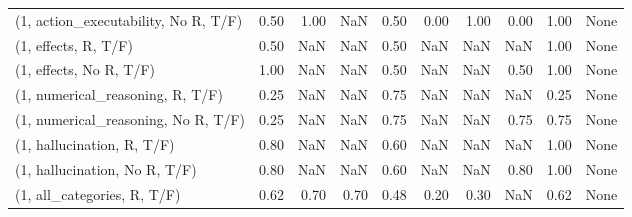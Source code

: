 \begin{table*}[h!]
\begin{adjustbox}{width=2\columnwidth,center}
\begin{tabular}{lrrr|rrr|rrr}
(1, action\_executability, No R, T/F) &                      0.50 &                  1.00 &                       NaN &                          0.50 &                      0.00 &                          1.00 &                                   0.00 &                               1.00 &                                  None \\
(1, effects, R, T/F)                 &                      0.50 &                   NaN &                       NaN &                          0.50 &                       NaN &                           NaN &                                    NaN &                               1.00 &                                  None \\
(1, effects, No R, T/F)              &                      1.00 &                   NaN &                       NaN &                          0.50 &                       NaN &                           NaN &                                   0.50 &                               1.00 &                                  None \\
(1, numerical\_reasoning, R, T/F)     &                      0.25 &                   NaN &                       NaN &                          0.75 &                       NaN &                           NaN &                                    NaN &                               0.25 &                                  None \\
(1, numerical\_reasoning, No R, T/F)  &                      0.25 &                   NaN &                       NaN &                          0.75 &                       NaN &                           NaN &                                   0.75 &                               0.75 &                                  None \\
(1, hallucination, R, T/F)           &                      0.80 &                   NaN &                       NaN &                          0.60 &                       NaN &                           NaN &                                    NaN &                               1.00 &                                  None \\
(1, hallucination, No R, T/F)        &                      0.80 &                   NaN &                       NaN &                          0.60 &                       NaN &                           NaN &                                   0.80 &                               1.00 &                                  None \\
(1, all\_categories, R, T/F)          &                      0.62 &                  0.70 &                      0.70 &                          0.48 &                      0.20 &                          0.30 &                                    NaN &                               0.62 &                                  None \\

\end{tabular}
\end{adjustbox}
\end{table*}
